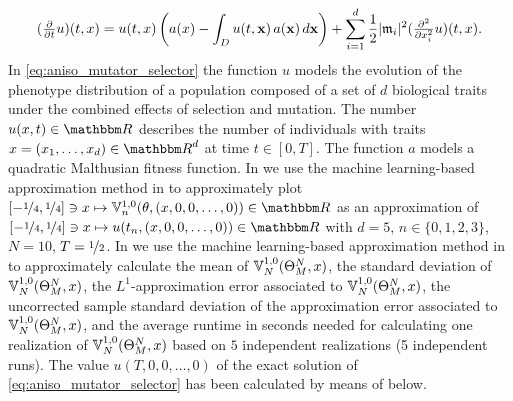%
\begin{equation}
	(\tfrac{\partial }{\partial t}u) (t,x) = u(t,x)\left(a(x) - \int_{D} u(t,{\textbf x})\, a({\textbf x}) \, d{\textbf x} \right) +  \sum_{i=1}^{d} \frac{1}{2} |\mathfrak{m}_i|^2 (\tfrac{\partial^2 }{\partial x_i^2} u) (t,x).
   \label{eq:aniso_mutator_selector}
\end{equation}
%
In \eqref{eq:aniso_mutator_selector} the function $u$ models the evolution of the phenotype distribution of a population composed of a set of $d$ biological traits under the combined effects of selection and mutation. 
The number $u(x,t) \in \R$ describes the number of individuals with traits $x = (x_1, \dots, x_d) \in \R^d$ at time $t \in [0,T]$.
The function $a$ models a quadratic Malthusian fitness function.
In  we use the machine learning-based approximation method in  to approximately plot 
$[-\nicefrac{1}{4}, \nicefrac{1}{4}] \ni x \mapsto \bV_n^{1,0}(\theta,(x, 0, 0, \dots,0)) \in \R$ 
as an approximation of 
$[-\nicefrac{1}{4}, \nicefrac{1}{4}] \ni x \mapsto u(t_n, (x, 0, 0, \dots,0)) \in \R$
with 
$d=5$, $n \in \{ 0, 1, 2, 3 \}$, $N=10$, $T = \nicefrac{1}{2}$.
%
In  
we use the machine learning-based approximation method
in  
to approximately calculate
the mean of %
$
{\mathbb{V}}^{1,0}_N(\Theta^N_M,x)
$,
the standard deviation of %
$
{\mathbb{V}}^{1,0}_N(\Theta^N_M,x)
$,
the $ L^1 $-approximation error associated to %
$
{\mathbb{V}}^{1,0}_N(\Theta^N_M,x)
$,
the uncorrected sample standard deviation of the approximation error associated to %
$
{\mathbb{V}}^{1,0}_N(\Theta^N_M,x)
$,
and the average runtime in seconds needed for calculating one realization of $
{\mathbb{V}}^{1,0}_N(\Theta^N_M,x)
$
%
based on $5$ independent realizations (5 independent runs).
%
The value $u(T,0,0,\ldots,0)$ of the exact solution of \eqref{eq:aniso_mutator_selector} has been calculated by means of  below.



